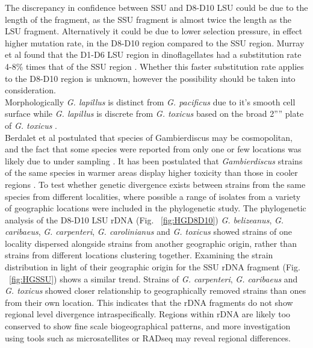 \documentclass[12pt]{article}
\begin{document}
The discrepancy in confidence between SSU and D8-D10 LSU could be due to the length of the fragment, as the SSU fragment is almost twice the length as the LSU fragment. Alternatively it could be due to lower selection pressure, in effect higher mutation rate, in the D8-D10 region compared to the SSU region. Murray et al found that the D1-D6 LSU region in dinoflagellates had a substitution rate 4-8\% times that of the SSU region \citep{murray2005improving}. 
Whether this faster substitution rate applies to the D8-D10 region is unknown, however the possibility should be taken into consideration. \\
Morphologically \emph{G. lapillus} is distinct from \emph{G. pacificus} due to it's smooth cell surface \citep{chinain1999morphology} while \emph{G. lapillus} is discrete from \emph{G. toxicus} based on the broad 2'''' plate of \emph{G. toxicus} \citep{litaker2009taxonomy}.\\

Berdalet et al postulated that species of Gambierdiscus may be cosmopolitan, and the fact that some species were reported from only one or few locations was likely due to under sampling \citep{litaker2010global}. 
It has been postulated that \textit{Gambierdiscus} strains of the same species  in warmer areas display higher toxicity than those in cooler regions \citep{bomber1989epiphytism}. 
To test whether genetic divergence exists between strains from the same species from different localities, where possible a range of isolates from a variety of geographic locations were included in the phylogenetic study. 
The phylogenetic analysis of the D8-D10 LSU rDNA (Fig. ~\ref{fig:HGD8D10})  \emph{G. belizeanus}, \emph{G. caribaeus}, \emph{G. carpenteri},  \emph{G. carolinianus} and \emph{G. toxicus} showed strains of one locality dispersed alongside strains from another geographic origin, rather than strains from different locations clustering together. 
Examining the strain distribution in light of their geographic origin for the SSU rDNA fragment (Fig. ~\ref{fig:HGSSU}) shows a similar trend. 
Strains of \emph{G. carpenteri}, \emph{G. caribaeus} and \emph{G. toxicus} showed closer relationship to geographically removed strains than ones from their own location.
This indicates that the rDNA fragments do not show regional level divergence intraspecifically. 
Regions within rDNA are likely too conserved to show fine scale biogeographical patterns, and more investigation using tools such as microsatellites or RADseq may reveal regional differences.
\end{document}
